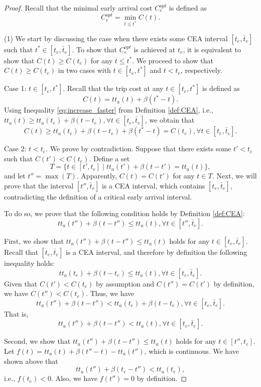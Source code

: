 \begin{proof}
Recall that the minimal early arrival cost  $C_e^{opt}$ is defined as $$C_e^{opt} = \min_{t \le t^*} C(t).$$

(1) We start by discussing the case when there exists some CEA interval $[t_e, \bar{t}_e]$ such that  $t^* \in [t_e, \bar{t}_e]$.  To show that $C_e^{opt}$ is achieved at $t_e$, it is equivalent to show that $C(t) \ge C(t_e) $ for any $t \le t^*$. We proceed to show that $C(t) \ge C(t_e)$ in two cases with $t \in [t_e, t^*]$ and $t < t_e$, respectively.    

Case 1: $t \in [t_e, t^*]$.  Recall that the trip cost at any $t \in [t_e, t^*]$ is defined as 
$$C(t) = tt_a(t) + \beta (t^* - t).$$
Using Inequality \eqref{eq:increase_faster} from Definition \ref{def:CEA}, i.e., $tt_a(t ) \ge tt_a(t_e)  + \beta (t - t_e ), \forall t \in [t_e, \bar t_e]$, we obtain that 
$$C(t) \ge tt_a(t_e) + \beta (t - t_e ) + \beta (t^* - t) = C(t_e), \forall t \in [t_e, \bar t_e].$$

Case 2: $t < t_e$. We prove by contradiction. Suppose that there exists some $t'< t_e$ such that $C(t') < C(t_e)$.  Define a set 
\begin{equation}\label{eq:def_T}
    T = \{t \in [t', t_e] \mid tt_a(t')  + \beta (t - t' ) =  tt_a(t )\},
\end{equation}
and let $t'' = \max(T).$ Apparently, $C(t) = C(t')$ for any $t \in T$. Next, we will prove that the interval $[t'', \bar{t}_e]$ is a CEA interval, which contains $[t_e, \bar{t}_e]$, contradicting the definition of a critical early arrival interval.


To do so, we prove that the following condition holds by Definition \ref{def:CEA}:
$$ tt_a(t'')  + \beta (t - t'' ) \le  tt_a(t ), \forall t \in [t'', \bar t_e].$$ 

First, we show that $ tt_a(t'')  + \beta (t - t'' ) \le  tt_a(t )$ holds for any $ t \in [t_e, \bar t_e] $. Recall that $[t_e, \bar t_e]$ is a CEA interval, and therefore by definition the following inequality holds:
$$tt_a(t_e)  + \beta (t - t_e ) \le  tt_a(t ), \forall t \in [t_e, \bar t_e].$$ 
Given that $C(t') < C(t_e)$ by assumption and $C(t'') = C(t')$ by definition, we have $C(t'') < C(t_e)$.  Thus, we have $$tt_a(t'')  + \beta (t - t'' ) < tt_a(t_e)  + \beta (t - t_e ), \forall t \in [t_e, \bar t_e]. $$
That is, $$tt_a(t'')  + \beta (t - t'' ) <  tt_a(t ), \forall t \in [t_e, \bar t_e].$$

Second,  we show that $ tt_a(t'')  + \beta (t - t'' ) \le  tt_a(t )$ holds for any $ t \in [t'',  t_e]$.  Let $ f(t)= tt_a(t)  + \beta (t'' - t ) -  tt_a(t'' ) $, which is continuous.  We have shown above that $$tt_a(t'')  + \beta (t_e - t'' ) <  tt_a(t_e),$$
i.e., $f(t_e) <0$. Also, we have $f(t'') =0$ by definition. 


\end{proof}
